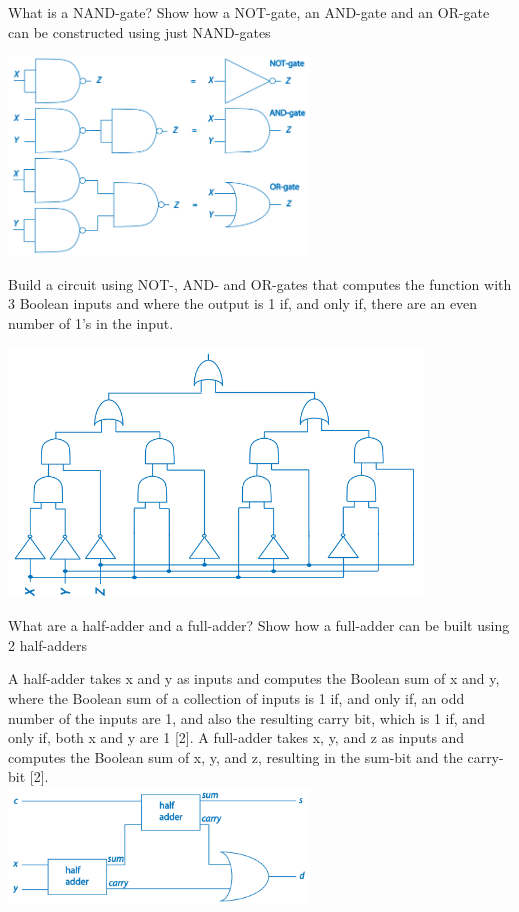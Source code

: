 \documentclass{exam}
\begin{document}
\begin{questions}
\question[10] What is a NAND-gate? Show how a NOT-gate, an AND-gate and an
OR-gate can be constructed using just NAND-gates
\begin{solution}[2in]
\includegraphics[width=8cm]{NAND.png}
\end{solution}
\newpage
\question[6]Build a circuit using NOT-, AND- and OR-gates that computes the
function with 3 Boolean inputs and where the output is 1 if, and only
if, there are an even number of 1’s in the input.
\begin{solution}[2in]
\includegraphics[width=11cm]{even.png}
\end{solution}
\question[7]What are a half-adder and a full-adder? Show how a full-adder can be
built using 2 half-adders
\begin{solution}[2in]
A half-adder takes x and y as inputs and computes the Boolean sum
of x and y, where the Boolean sum of a collection of inputs is 1 if, and
only if, an odd number of the inputs are 1, and also the resulting carry
bit, which is 1 if, and only if, both x and y are 1 [2]. A full-adder takes
x, y, and z as inputs and computes the Boolean sum of x, y, and z,
resulting in the sum-bit and the carry-bit [2].\\
\includegraphics[width=8cm]{full_adder.png}

\end{solution}
\end{questions}
\end{document}
